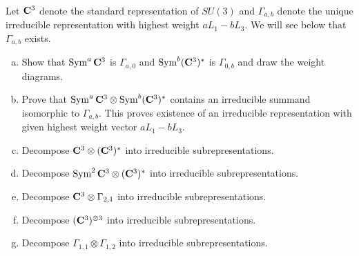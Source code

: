 \documentclass[12pt]{article}
\begin{document}
\bigskip

\begin{question}\ \\
Let $\mathbf{C}^3$ denote the standard representation of $SU(3)$ and $\Gamma_{a,b}$ denote the unique irreducible representation with highest weight $aL_1-bL_3$. We will see below that $\Gamma_{a,b}$ exists.
\begin{enumerate}[(a)]
\item Show that $\operatorname{Sym}^a\mathbf{C}^3$ is $\Gamma_{a,0}$ and $\operatorname{Sym}^b(\mathbf{C}^3)^*$ is $\Gamma_{0,b}$ and draw the weight diagrams.
\item Prove that $\operatorname{Sym}^a\mathbf{C}^3\otimes\operatorname{Sym}^b(\mathbf{C}^3)^*$ contains an irreducible summand isomorphic to $\Gamma_{a,b}$. This proves existence of an irreducible representation with given highest weight vector $aL_1-bL_3$.
\item Decompose $\mathbf{C}^3\otimes(\mathbf{C}^3)^*$ into irreducible subrepresentations.
\item Decompose $\operatorname{Sym}^2\mathbf{C}^3\otimes(\mathbf{C}^3)^*$ into irreducible subrepresentations.
\item Decompose $\mathbf{C}^3\otimes\Gamma_{2,1}$ into irreducible subrepresentations.
\item Decompose $(\mathbf{C}^3)^{\otimes 3}$ into irreducible subrepresentations.
\item Decompose $\Gamma_{1,1}\otimes\Gamma_{1,2}$ into irreducible subrepresentations.
\end{enumerate}
\end{question}
\end{document}
